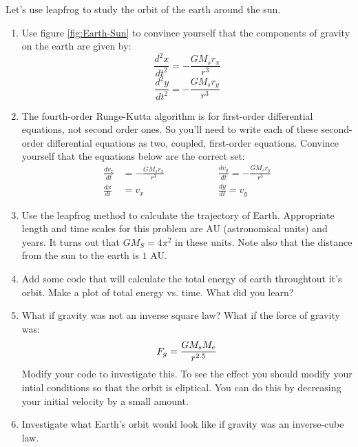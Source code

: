\begin{enumerate}
\probtwo Let's use leapfrog to study the orbit of the earth around the
sun.
\begin{enumerate}
\item Use figure \ref{fig:Earth-Sun} to convince yourself that the
  components of gravity on the earth are given by:
\begin{equation}
\frac{d^2x}{dt^2} = -\frac{G M_s r_x}{r^3}
\end{equation}
\begin{equation}
\frac{d^2y}{dt^2} = -\frac{G M_s r_y}{r^3}
\end{equation}
\item The fourth-order Runge-Kutta algorithm is for first-order
  differential equations, not second order ones.  So you'll need to
  write each of these second-order differential equations as two,
  coupled, first-order equations.  Convince  yourself that the
  equations below are the correct set:
\begin{eqnarray}
\frac{dv_x}{dt} &= -\frac{G M_s r_x}{r^3}& \hspace{2cm}\frac{dv_y}{dt} = -\frac{G M_s r_y}{r^3}\\
\frac{dx}{dt} &= v_x & \hspace{2cm}\frac{dy}{dt} = v_y
\end{eqnarray}
\item Use the leapfrog method to calculate the trajectory of Earth.
  Appropriate length and time scales for this problem are AU
  (astronomical units) and years.  It turns out that $G M_S = 4 \pi^2$
  in these units.  Note also that the distance from the sun to the
  earth is $1 $ AU.
\item Add some code that will calculate the total energy of earth
  throughtout it's orbit.  Make a plot of total energy vs. time.  What
  did you learn?
\item  What if gravity was not an inverse square law?  What if the
  force of gravity was:
\begin{equation}
F_g = {G M_s M_e\over r^{2.5}}
\end{equation}
Modify your code to investigate this.  To see the effect you should
modify your intial conditions so that the orbit is eliptical.  You can
do this by decreasing your initial velocity by a small amount.
\item Investigate what Earth's orbit would look like if gravity was an
  inverse-cube law.
\end{enumerate}
\end{enumerate}
